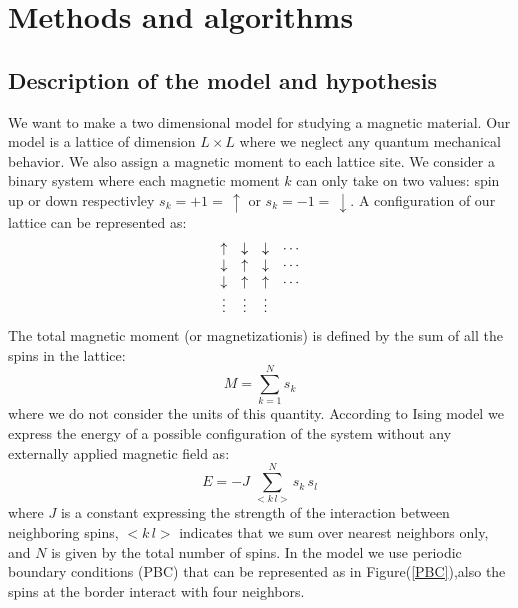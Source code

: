 \documentclass[%
preprint,
 amsmath,amssymb,
 aps,
]{revtex4-1}
\theoremstyle{plain}
\theoremstyle{definition}
\theoremstyle{plain}
\begin{document}
\section{Methods and algorithms}
\subsection{Description of the model and hypothesis}
We want to make a two dimensional model for studying a magnetic material. Our model is a lattice of dimension $L \times L$ where we neglect any quantum mechanical behavior. We also assign a magnetic moment to each lattice site. We consider a binary system where each magnetic moment $k$ can only take on two values: spin up or down respectivley $s_k=+1=\, \uparrow$ or $s_k=-1=\, \downarrow$. A configuration of our lattice can be represented as:
\begin{equation} \notag
\begin{array}{cccc}
\uparrow & \downarrow & \downarrow  & \cdots \\
\downarrow & \uparrow & \downarrow & \cdots \\
\downarrow & \uparrow & \uparrow &  \cdots \\
\vdots & \vdots & \vdots &  \\
\end{array}
\end{equation}
The total magnetic moment (or magnetizationis) is defined by the sum of all the spins in the lattice:
\begin{equation}
M = \sum_{k=1} ^N s_k
\end{equation}
where we do not consider the units of this quantity.
According to Ising model we express the energy of a possible configuration of the system without any externally applied magnetic field as:
\begin{equation}
\label{energy}
E = -J \, \sum_{<k \, l>} ^N s_k \, s_l
\end{equation}
where $J$ is a constant expressing the strength of the interaction between neighboring spins, $<k \, l>$  indicates that we sum over nearest neighbors only, and $N$ is given by the total number of spins. In the model we use periodic boundary conditions (PBC) that can be represented as in Figure(\ref{PBC}),also the spins at the border interact with four neighbors.
\end{document}
